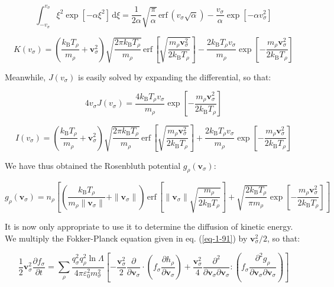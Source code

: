 \begin{equation}
    \int_{-v_\sigma}^{v_\sigma}\xi^2\exp{[-\alpha\xi^2]}\,\mathrm{d}\xi=\frac{1}{2\alpha}\sqrt{\frac{\pi}{\alpha}}\,\text{erf}\,(v_\sigma\sqrt{\alpha})-\frac{v_\sigma}{\alpha}\exp{[-\alpha v_\sigma^2]}
\end{equation}

\begin{equation}
    K(v_\sigma)=\left(\frac{k_\mathrm{B}T_\rho}{m_\rho}+\mathbf{v}_\sigma^2\right)\sqrt{\frac{2\pi k_\mathrm{B}T_\rho}{m_\rho}}\,\text{erf}\,\left[\sqrt{\frac{m_\rho\mathbf{v}_\sigma^2}{2k_\mathrm{B}T_\rho}}\right]-\frac{2k_\mathrm{B}T_\rho v_\sigma}{m_\rho}\exp{\left[-\frac{m_\rho\mathbf{v}_\sigma^2}{2k_\mathrm{B}T_\rho}\right]}
\end{equation}

Meanwhile, $J(v_\sigma)$ is easily solved by expanding the differential, so that:

\begin{equation}
    4v_\sigma J(v_\sigma)=\frac{4k_\mathrm{B}T_\rho v_\sigma}{m_\rho}\exp{\left[-\frac{m_\rho\mathbf{v}_\sigma^2}{2k_\mathrm{B}T_\rho}\right]}
\end{equation}

\begin{equation}
    I(v_\sigma)=\left(\frac{k_\mathrm{B}T_\rho}{m_\rho}+\mathbf{v}_\sigma^2\right)\sqrt{\frac{2\pi k_\mathrm{B}T_\rho}{m_\rho}}\,\text{erf}\,\left[\sqrt{\frac{m_\rho\mathbf{v}_\sigma^2}{2k_\mathrm{B}T_\rho}}\right]+\frac{2k_\mathrm{B}T_\rho v_\sigma}{m_\rho}\exp{\left[-\frac{m_\rho\mathbf{v}_\sigma^2}{2k_\mathrm{B}T_\rho}\right]}
\end{equation}

We have thus obtained the Rosenbluth potential $g_\rho(\mathbf{v}_\sigma)$:

\begin{equation}
    g_\rho(\mathbf{v}_\sigma)=n_\rho\left[\left(\frac{k_\mathrm{B}T_\rho}{m_\rho\|\mathbf{v}_\sigma\|}+\|\mathbf{v}_\sigma\|\right)\,\text{erf}\,\left[\|\mathbf{v}_\sigma\|\sqrt{\frac{m_\rho}{2k_\mathrm{B}T_\rho}}\right]+\sqrt{\frac{2k_\mathrm{B}T_\rho}{\pi m_\rho}}\exp{\left[-\frac{m_\rho\mathbf{v}_\sigma^2}{2k_\mathrm{B}T_\rho}\right]}\right]
\end{equation}

It is now only appropriate to use it to determine the diffusion of kinetic energy. We multiply the Fokker-Planck equation given in eq. (\ref{eq-1-91}) by $\mathbf{v}_\sigma^2/2$, so that:

\begin{equation}
    \frac{1}{2}\mathbf{v}_\sigma^2\frac{\partial f_\sigma}{\partial t}=\sum_{\rho}\frac{q_\sigma^2q_\rho^2\ln{\Lambda}}{4\pi\varepsilon_0^2m_\sigma^2}\left[-\frac{\mathbf{v}_\sigma^2}{2}\frac{\partial}{\partial\mathbf{v}_\sigma}\cdot\left(f_\sigma\frac{\partial h_\rho}{\partial\mathbf{v}_\sigma}\right)+\frac{\mathbf{v}_\sigma^2}{4}\frac{\partial^2}{\partial\mathbf{v}_\sigma\partial\mathbf{v}_\sigma}:\left(f_\sigma\frac{\partial^2g_\rho}{\partial\mathbf{v}_\sigma\partial\mathbf{v}_\sigma}\right)\right]
\end{equation}

